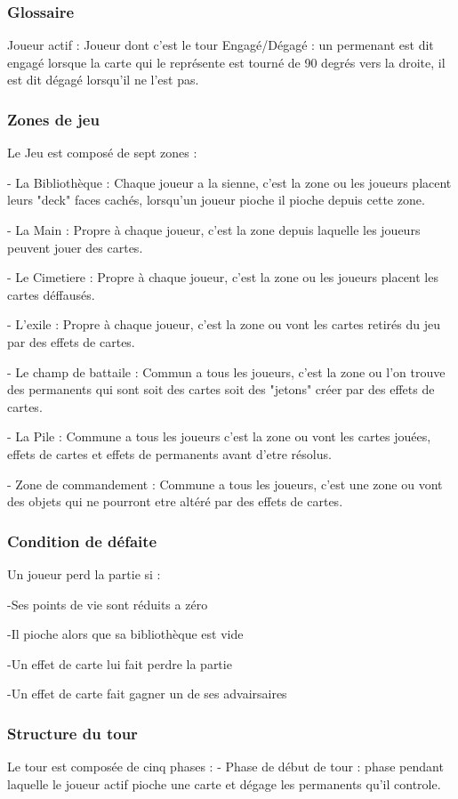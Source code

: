 \documentclass[a4paper,12pt]{article}
\begin{document}
\subsubsection{Glossaire}

Joueur actif : Joueur dont c'est le tour
Engagé/Dégagé : un permenant est dit engagé lorsque la carte qui le représente est tourné de 90 degrés vers la droite, il est dit dégagé lorsqu'il ne l'est pas. 

\subsubsection{Zones de jeu}
Le Jeu est composé de sept zones :

- La Bibliothèque : Chaque joueur a la sienne, c'est la zone ou les joueurs placent leurs "deck" faces cachés, lorsqu'un joueur pioche il pioche depuis cette zone.

- La Main : Propre à chaque joueur, c'est la zone depuis laquelle les joueurs peuvent jouer des cartes.

- Le Cimetiere : Propre à chaque joueur, c'est la zone ou les joueurs placent les cartes déffausés.

- L'exile : Propre à chaque joueur, c'est la zone ou vont les cartes retirés du jeu par des effets de cartes.

- Le champ de battaile : Commun a tous les joueurs, c'est la zone ou l'on trouve des permanents qui sont soit des cartes soit des "jetons" créer par des effets de cartes.

- La Pile : Commune a tous les joueurs c'est la zone ou vont les cartes jouées, effets de cartes et effets de permanents avant d'etre résolus.

- Zone de commandement : Commune a tous les joueurs, c'est une zone ou vont des objets qui ne pourront etre altéré par des effets de cartes.

\subsubsection{Condition de défaite}
Un joueur perd la partie si : 

-Ses points de vie sont réduits a zéro

-Il pioche alors que sa bibliothèque est vide

-Un effet de carte lui fait perdre la partie

-Un effet de carte fait gagner un de ses advairsaires 

\subsubsection{Structure du tour}
Le tour est composée de cinq phases : 
- Phase de début de tour : phase pendant laquelle le joueur actif pioche une carte et dégage les permanents qu'il controle.
\end{document}
